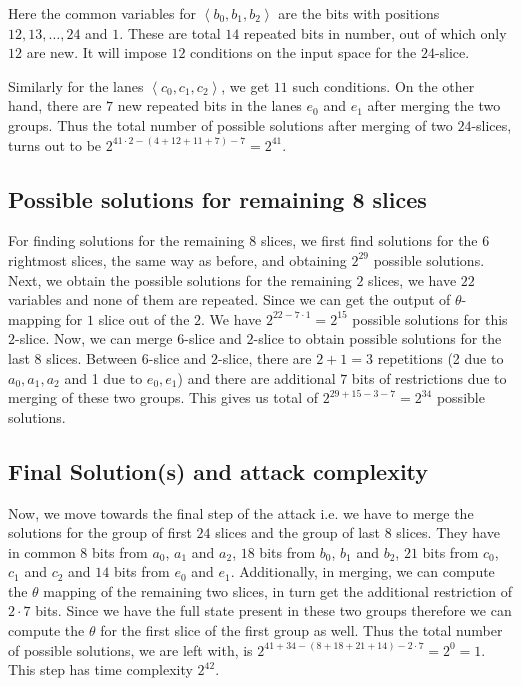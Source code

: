 Here the common variables for $\left< b_0, b_1, b_2\right>$ are the bits with positions
$12, 13,\ldots, 24$ and $1$. These are total $14$ repeated bits in number, out of which only $12$ are new. It will impose $12$ conditions on the input space for the $24$-slice.

Similarly for the lanes $\left< c_0, c_1,c_2 \right>$, we get $11$ such conditions.
On the other hand, there are $7$ new repeated bits in the lanes $e_0$ and $e_1$ after merging the two groups. Thus the total number of possible solutions after merging of two $24$-slices, turns out to be $2^{41\cdot 2 - (4 + 12 + 11 + 7) - 7 } = 2^{41}$.

\subsection{Possible solutions for remaining 8 slices} 
For finding solutions for the remaining $8$ slices, we first find solutions for the $6$ rightmost slices, the same way as before, and obtaining $2^{29}$ possible solutions. 
Next, we obtain the possible solutions for the remaining $2$ slices, we have $22$ variables and none of them are repeated. Since we can get the output of $\theta$-mapping for $1$ slice out of the $2$. We have  $2^{22 - 7\cdot 1} = 2^{15}$ possible solutions for this $2$-slice.
Now, we can merge $6$-slice and $2$-slice to obtain possible solutions for the last $8$ slices. Between $6$-slice and $2$-slice, there are $2 + 1 = 3$ repetitions (2 due to $a_0,a_1,a_2$ and 1 due to $e_0, e_1$) and there are additional $7$ bits of restrictions due to merging of these two groups. This gives us total of $2^{29 + 15 - 3 -7} = 2^{34}$ possible solutions.

\subsection{Final Solution(s) and attack complexity}
Now, we move towards the final step of the attack i.e. we have to merge the solutions for the group of first $24$ slices and the group of last $8$ slices. They have in common $8$ bits from $a_0$, $a_1$ and  $a_2$, $18$ bits from $b_0$, $b_1$ and $b_2$, $21$ bits from $c_0$, $c_1$ and $c_2$ and $14$ bits from $e_0$ and $e_1$. Additionally, in merging, we can compute the $\theta$ mapping of the remaining two slices, in turn get the additional restriction of $2\cdot 7$ bits. Since we have the full state present in these two groups therefore we can compute the $\theta$ for the first slice of the first group as well. Thus the total number of possible solutions, we are left with, is $2^{41 + 34 - (8 + 18 + 21 + 14) - 2 \cdot 7} = 2^{0} = 1$. This step has time complexity $ 2^{42}$.

